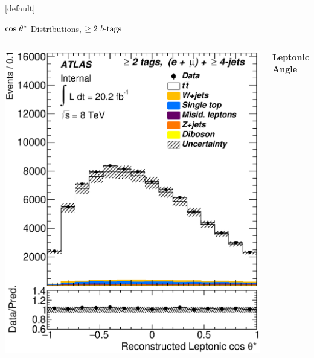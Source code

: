 \documentclass{beamer}
\begin{document}
{  \makeatletter %
  [default]
  \def\beamer@entrycode{\vspace*{-1.075\headheight}}
  \begin{frame}{$\lowercase{\text{cos}}~\theta^*$ Distributions, $\geq2\text{ } \lowercase{ b\text{-tags}}$}
    \begin{columns}
      \includegraphics[width=\textwidth]{../chapters/whel/figures/control_Plots2/elmu_2incl_LH48/CosTheta_reco_lep_elmu}\\
      \vspace{-10pt}\begin{center}\textbf{Leptonic Angle}\end{center}

\end{columns}
\end{frame}}
\end{document}
